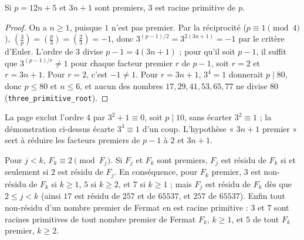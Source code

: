 \begin{enonce}
Si $p = 12n + 5$ et $3n + 1$ sont premiers, $3$ est racine primitive de $p$.
\end{enonce}

\begin{proof}
On a $n \geq 1$, puisque $1$ n'est pas premier. Par la réciprocité ($p \equiv 1 \pmod 4$), $\left(\frac{3}{p}\right) = \left(\frac{p}{3}\right) = \left(\frac{2}{3}\right) = -1$, donc $3^{(p-1)/2} = 3^{2(3n+1)} = -1$ par le critère d'Euler. L'ordre de $3$ divise $p - 1 = 4(3n+1)$ ; pour qu'il soit $p-1$, il suffit que $3^{(p-1)/r} \neq 1$ pour chaque facteur premier $r$ de $p-1$, soit $r = 2$ et $r = 3n+1$. Pour $r = 2$, c'est $-1 \neq 1$. Pour $r = 3n+1$, $3^4 = 1$ donnerait $p \mid 80$, donc $p \leq 80$ et $n \leq 6$, et aucun des nombres $17, 29, 41, 53, 65, 77$ ne divise $80$ (\texttt{three\_primitive\_root}).
\end{proof}

\begin{remarque}
La page exclut l'ordre $4$ par $3^2 + 1 \equiv 0$, soit $p \mid 10$, sans écarter $3^2 \equiv 1$ ; la démonstration ci-dessus écarte $3^4 \equiv 1$ d'un coup. L'hypothèse « $3n + 1$ premier » sert à réduire les facteurs premiers de $p - 1$ à $2$ et $3n+1$.
\end{remarque}

\begin{enonce}
Pour $j < k$, $F_k \equiv 2 \pmod{F_j}$. Si $F_j$ et $F_k$ sont premiers, $F_j$ est résidu de $F_k$ si et seulement si $2$ est résidu de $F_j$. En conséquence, pour $F_k$ premier, $3$ est non-résidu de $F_k$ si $k \geq 1$, $5$ si $k \geq 2$, et $7$ si $k \geq 1$ ; mais $F_j$ est résidu de $F_k$ dès que $2 \leq j < k$ (ainsi $17$ est résidu de $257$ et de $65537$, et $257$ de $65537$). Enfin tout non-résidu d'un nombre premier de Fermat en est racine primitive : $3$ et $7$ sont racines primitives de tout nombre premier de Fermat $F_k$, $k \geq 1$, et $5$ de tout $F_k$ premier, $k \geq 2$.
\end{enonce}

